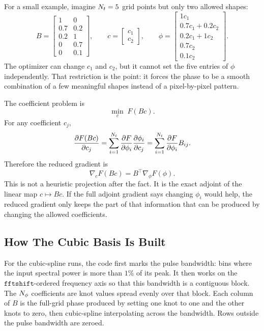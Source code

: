 \documentclass[11pt]{article}
\begin{document}
For a small example, imagine \(N_t=5\) grid points but only two allowed shapes:
\[
    B =
    \begin{bmatrix}
    1 & 0\\
    0.7 & 0.2\\
    0.2 & 1\\
    0 & 0.7\\
    0 & 0.1
    \end{bmatrix},
    \qquad
    c =
    \begin{bmatrix}
    c_1\\ c_2
    \end{bmatrix},
    \qquad
    \phi =
    \begin{bmatrix}
    1c_1\\
    0.7c_1+0.2c_2\\
    0.2c_1+1c_2\\
    0.7c_2\\
    0.1c_2
    \end{bmatrix}.
\]
The optimizer can change \(c_1\) and \(c_2\), but it cannot set the five
entries of \(\phi\) independently. That restriction is the point: it forces the
phase to be a smooth combination of a few meaningful shapes instead of a
pixel-by-pixel pattern.

The coefficient problem is
\[
    \min_c \; F(Bc).
\]
For any coefficient \(c_j\),
\[
    \frac{\partial F(Bc)}{\partial c_j}
    =
    \sum_{i=1}^{N_t}
    \frac{\partial F}{\partial \phi_i}
    \frac{\partial \phi_i}{\partial c_j}
    =
    \sum_{i=1}^{N_t}
    \frac{\partial F}{\partial \phi_i} B_{ij}.
\]
Therefore the reduced gradient is
\[
    \nabla_c F(Bc) = B^\top \nabla_\phi F(\phi).
\]
This is not a heuristic projection after the fact. It is the exact adjoint of
the linear map \(c\mapsto Bc\). If the full adjoint gradient says changing
\(\phi_i\) would help, the reduced gradient only keeps the part of that
information that can be produced by changing the allowed coefficients.

\subsection*{How The Cubic Basis Is Built}

For the cubic-spline runs, the code first marks the pulse bandwidth: bins where
the input spectral power is more than \(1\%\) of its peak. It then works on the
\(\texttt{fftshift}\)-ordered frequency axis so that this bandwidth is a
contiguous block. The \(N_{\phi}\) coefficients are knot values spread evenly over
that block. Each column of \(B\) is the full-grid phase produced by setting one
knot to one and the other knots to zero, then cubic-spline interpolating across
the bandwidth. Rows outside the pulse bandwidth are zeroed.
\end{document}
